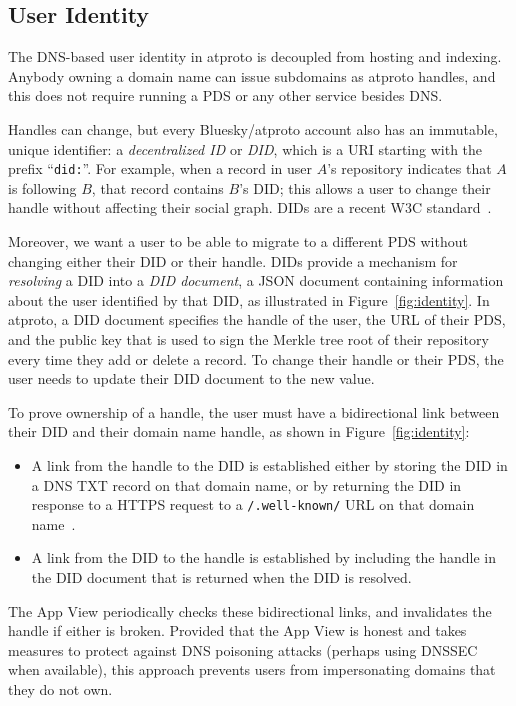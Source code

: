\documentclass[sigconf]{acmart}
\begin{document}
\subsection{User Identity}\label{sec:identity}

The DNS-based user identity in atproto is decoupled from hosting and indexing.
Anybody owning a domain name can issue subdomains as atproto handles, and this does not require running a PDS or any other service besides DNS.

Handles can change, but every Bluesky/atproto account also has an immutable, unique identifier: a \emph{decentralized ID} or \emph{DID}, which is a URI starting with the prefix ``\texttt{did:}''.
For example, when a record in user $A$'s repository indicates that $A$ is following $B$, that record contains $B$'s DID; this allows a user to change their handle without affecting their social graph.
DIDs are a recent W3C standard~\cite{DIDCore}.

Moreover, we want a user to be able to migrate to a different PDS without changing either their DID or their handle.
DIDs provide a mechanism for \emph{resolving} a DID into a \emph{DID document}, a JSON document containing information about the user identified by that DID, as illustrated in Figure~\ref{fig:identity}.
In atproto, a DID document specifies the handle of the user, the URL of their PDS, and the public key that is used to sign the Merkle tree root of their repository every time they add or delete a record.
To change their handle or their PDS, the user needs to update their DID document to the new value.

To prove ownership of a handle, the user must have a bidirectional link between their DID and their domain name handle, as shown in Figure~\ref{fig:identity}:
\begin{itemize}
    \item A link from the handle to the DID is established either by storing the DID in a DNS TXT record on that domain name, or by returning the DID in response to a HTTPS request to a \texttt{/.well-known/} URL on that domain name~\cite{DomainHandle}.
    \item A link from the DID to the handle is established by including the handle in the DID document that is returned when the DID is resolved.
\end{itemize}
The App View periodically checks these bidirectional links, and invalidates the handle if either is broken.
Provided that the App View is honest and takes measures to protect against DNS poisoning attacks (perhaps using DNSSEC when available), this approach prevents users from impersonating domains that they do not own.
\end{document}
